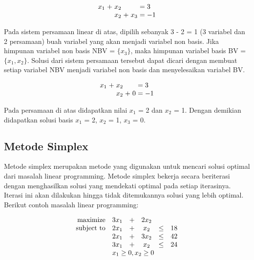 \begin{equation*}
	\setlength\arraycolsep{1.5pt}
	\begin{array}{r c r c r c l}
		x_1 &+ &x_2 &  &    &= &3\\
		    &  &x_2 &+ &x_3 &= &-1
	\end{array}
\end{equation*}

Pada sistem persamaan linear di atas, dipilih sebanyak 3 - 2 = 1 (3 variabel dan 2 persamaan) buah variabel yang akan menjadi variabel non basis. Jika himpunan variabel non basis NBV = \(\{x_3\}\), maka himpunan variabel basis BV = \(\{x_1, x_2\}\). Solusi dari sistem persamaan tersebut dapat dicari dengan membuat setiap variabel NBV menjadi variabel non basis dan menyelesaikan variabel BV.

\begin{equation*}
	\setlength\arraycolsep{1.5pt}
	\begin{array}{r c r c r c l}
		x_1 &+ &x_2 &  &    &= &3\\
		    &  &x_2 &+ &0 &= &-1
	\end{array}
\end{equation*}

Pada persamaan di atas didapatkan nilai \(x_1\) = 2 dan \(x_2\) = 1. Dengan demikian didapatkan solusi basis \(x_1\) = 2, \(x_2\) = 1, \(x_3\) = 0.

\subsection{Metode Simplex}
\label{metode_simplex}

Metode simplex merupakan metode yang digunakan untuk mencari solusi optimal dari masalah linear programming. Metode simplex bekerja secara beriterasi dengan menghasilkan solusi yang mendekati optimal pada setiap iterasinya. Iterasi ini akan dilakukan hingga tidak ditemukannya solusi yang lebih optimal. Berikut contoh masalah linear programming:

\begin{equation*}
	\begin{array}{r c c c c l}
		\text{maximize}   & 3x_1 & + & 2x_2 \\
		\text{subject to} & 2x_1 & + & x_2  & \leq & 18 \\
        					& 2x_1 & + & 3x_2 & \leq & 42 \\
                           	& 3x_1 & + & x_2  & \leq & 24 \\
                           	& \multicolumn{5}{l}{x_1\geq0,x_2\geq0} \\
	\end{array}
\end{equation*}
        
